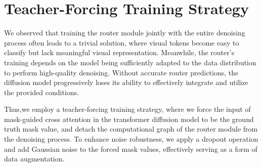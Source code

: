 \section{Teacher-Forcing Training Strategy}
We observed that training the router module jointly with the entire denoising process often leads to a trivial solution, where visual tokens become easy to classify but lack meaningful visual representation. Meanwhile, the router's training depends on the model being sufficiently adapted to the data distribution to perform high-quality denoising. Without accurate router predictions, the diffusion model progressively loses its ability to effectively integrate and utilize the provided conditions.

Thus,we employ a teacher-forcing training strategy, where we force the input of mask-guided cross attention in the transformer diffusion model to be the ground truth mask value, and detach the computational graph of the router module from the denoising process.
To enhance noise robustness, we apply a dropout operation and add Gaussian noise to the forced mask values, effectively serving as a form of data augmentation.